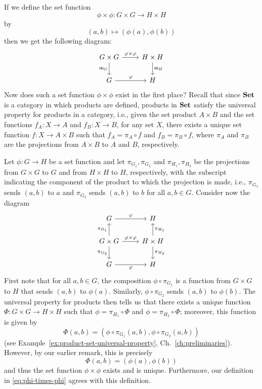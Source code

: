 If we define the set function
\[
    \phi \times \phi: G \times G \to H \times H
\]
by
\begin{equation}
    \label{eq:phi-times-phi}
    (a, b) \mapsto (\phi(a), \phi(b))
\end{equation}
then we get the following diagram:
\begin{equation}
    \begin{tikzcd}
        G \times G \arrow{r}{\phi \times \phi} \arrow[swap]{d}{\mult_G} & H \times H \arrow{d}{\mult_H} \\
        G \arrow{r}{\phi} & H
    \end{tikzcd}
    \label{eq:group-homomorphism-diagram}
\end{equation}
Now does such a set function \(\phi \times \phi\) exist in the first place?
Recall that since \(\mathbf{Set}\) is a category in which products are defined, products
in \(\mathbf{Set}\) satisfy the universal property for products in a category, i.e.,
given the set product \(A \times B\) and the set functions \(f_A : X \to A\) and
\(f_B : X \to B\), for any set \(X\), there exists a unique set function \(f: X
\to A \times B\) such that \(f_A = \pi_A \circ f\) and \(f_B = \pi_B \circ f\),
where \(\pi_A\) and \(\pi_B\) are the projections from \(A \times B\) to \(A\)
and \(B\), respectively. 

Let \(\phi : G \to H\) be a set function and let \(\pi_{G_1}, \pi_{G_2}\) and
\(\pi_{H_1}, \pi_{H_2}\) be the projections from \(G \times G\) to \(G\) and
from \(H \times H\) to \(H\), respectively, with the subscript indicating the
component of the product to which the projection is made, i.e., \(\pi_{G_1}\)
sends \((a, b)\) to \(a\) and \(\pi_{G_2}\) sends \((a, b)\) to \(b\) for all
\(a, b \in G\). Consider now the diagram
\[
    \begin{tikzcd}
        G \arrow[r, "\phi"]                                                                  & H                                                        \\
        G\times G \arrow[d, "\pi_{G_2}"'] \arrow[u, "\pi_{G_1}"] \arrow[r, "\phi\times\phi"] & H\times H \arrow[u, "\pi_{H_1}"'] \arrow[d, "\pi_{H_2}"] \\
        G \arrow[r, "\phi"']                                                                 & H                                                       
        \end{tikzcd}
\]
First note that for all \(a, b\in G\), the composition \(\phi \circ \pi_{G_1}\)
is a function from \(G \times G\) to \(H\) that sends \((a, b)\) to \(\phi(a)\).
Similarly, \(\phi \circ \pi_{G_2}\) sends \((a, b)\) to \(\phi(b)\). The
universal property for products then tells us that there exists a unique
function \(\Phi : G \times G \to H \times H\) such that \(\phi = \pi_{H_1} \circ
\Phi\) and \(\phi = \pi_{H_2} \circ \Phi\); moreover, this function is given by 
\[
        \Phi(a, b) = (\phi\circ\pi_{G_1}(a, b), \phi\circ\pi_{G_2}(a, b))
\]
(see Example~\ref{ex:product-set-universal-property},
Ch.~\ref{ch:preliminaries}). However, by our earlier remark, this is precisely
\[
    \Phi(a, b) = (\phi(a), \phi(b))
\]
and thus the set function \(\phi \times \phi\) exists and is unique.
Furthermore, our definition in \eqref{eq:phi-times-phi} agrees with this
definition.

